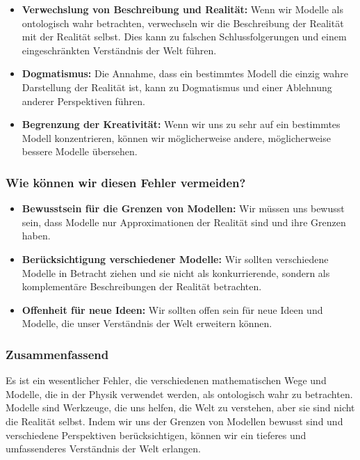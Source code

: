 \documentclass{article}
\begin{document}
\begin{itemize}
	\item \textbf{Verwechslung von Beschreibung und Realität:} Wenn wir Modelle als ontologisch wahr betrachten, verwechseln wir die Beschreibung der Realität mit der Realität selbst. Dies kann zu falschen Schlussfolgerungen und einem eingeschränkten Verständnis der Welt führen.
	\item \textbf{Dogmatismus:} Die Annahme, dass ein bestimmtes Modell die einzig wahre Darstellung der Realität ist, kann zu Dogmatismus und einer Ablehnung anderer Perspektiven führen.
	\item \textbf{Begrenzung der Kreativität:} Wenn wir uns zu sehr auf ein bestimmtes Modell konzentrieren, können wir möglicherweise andere, möglicherweise bessere Modelle übersehen.
\end{itemize}

\subsubsection{Wie können wir diesen Fehler vermeiden?}

\begin{itemize}
	\item \textbf{Bewusstsein für die Grenzen von Modellen:} Wir müssen uns bewusst sein, dass Modelle nur Approximationen der Realität sind und ihre Grenzen haben.
	\item \textbf{Berücksichtigung verschiedener Modelle:} Wir sollten verschiedene Modelle in Betracht ziehen und sie nicht als konkurrierende, sondern als komplementäre Beschreibungen der Realität betrachten.
	\item \textbf{Offenheit für neue Ideen:} Wir sollten offen sein für neue Ideen und Modelle, die unser Verständnis der Welt erweitern können.
\end{itemize}

\subsubsection{Zusammenfassend}

Es ist ein wesentlicher Fehler, die verschiedenen mathematischen Wege und Modelle, die in der Physik verwendet werden, als ontologisch wahr zu betrachten. Modelle sind Werkzeuge, die uns helfen, die Welt zu verstehen, aber sie sind nicht die Realität selbst. Indem wir uns der Grenzen von Modellen bewusst sind und verschiedene Perspektiven berücksichtigen, können wir ein tieferes und umfassenderes Verständnis der Welt erlangen.
\end{document}
